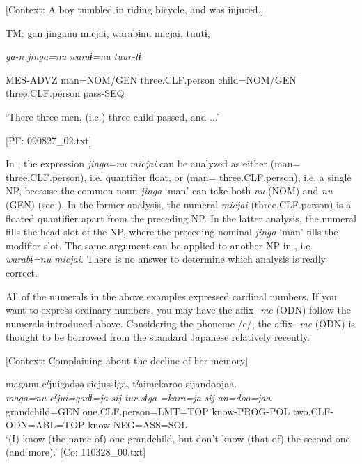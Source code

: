 \ea \label{ex:7:17}  [Context: A boy tumbled in riding bicycle, and was injured.]

  TM:  gan  jinganu  micjai,  warabɨnu  micjai,  tuutɨ,

    \textit{ga-n}  \textit{jinga=nu}  \textit{}  \textit{waraɨ=nu} \textit{}  \textit{tuur-tɨ}
                                                                         
    MES-ADVZ  man=NOM/GEN  three.CLF.person  child=NOM/GEN   three.CLF.person  pass-SEQ

    ‘There three men, (i.e.) three child passed, and ...’

    [PF: 090827\_02.txt]
\z

In , the expression \textit{jinga=nu} \textit{micjai} can be analyzed as either (man= three.CLF.person), i.e. quantifier float, or (man= three.CLF.person), i.e. a single NP, because the common noun \textit{jinga} ‘man’ can take both \textit{nu} (NOM) and \textit{nu} (GEN) (see ). In the former analysis, the numeral \textit{micjai} (three.CLF.person) is a floated quantifier apart from the preceding NP. In the latter analysis, the numeral fills the head slot of the NP, where the preceding nominal \textit{jinga} ‘man’ fills the modifier slot. The same argument can be applied to another NP in , i.e. \textit{warabɨ=nu} \textit{micjai}. There is no answer to determine which analysis is really correct.

  All of the numerals in the above examples expressed cardinal numbers. If you want to express ordinary numbers, you may have the affix \textit{{}-me} (ODN) follow the numerals introduced above. Considering the phoneme /e/, the affix \textit{{}-me} (ODN) is thought to be borrowed from the standard Japanese relatively recently.

\ea \label{ex:7:18}  [Context: Complaining about the decline of her memory]

\glll  maganu  cˀjuigadəə  sicjussɨga,   tˀaimekaroo  sijandoojaa.\\
\textit{maga=nu}  \textit{cˀjui=gadɨ=ja}  \textit{sij-tur-sɨga}  \textit{=kara=ja}  \textit{sij-an=doo=jaa}\\
grandchild=GEN  one.CLF.person=LMT=TOP  know-PROG-POL            two.CLF-ODN=ABL=TOP  know-NEG=ASS=SOL\\
\glt ‘(I) know (the name of) one grandchild, but don’t know (that of) the second one (and more).’ [Co: 110328\_00.txt]
\z


